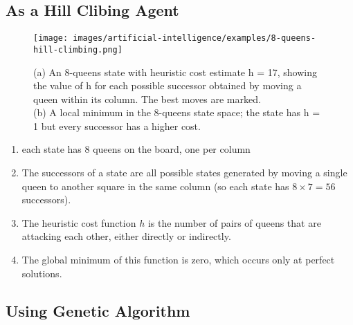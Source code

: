 \subsection{As a Hill Clibing Agent}

\begin{figure}[H]
    \centering
    \texttt{[image: images/artificial-intelligence/examples/8-queens-hill-climbing.png]}
    \caption{
        (a) An 8-queens state with heuristic cost estimate h = 17, showing the value of h for each possible successor obtained by moving a queen within its column. The best moves are marked.  
        \hfill \cite{ai/book/Artificial-Intelligence-A-Modern-Approach/Russell-Norvig}
        \\
        (b) A local minimum in the 8-queens state space; the state has h = 1 but every successor has a higher cost.
        \hfill \cite{ai/book/Artificial-Intelligence-A-Modern-Approach/Russell-Norvig}
    }
\end{figure}

\vspace{0.5cm}

\begin{enumerate}
    \item each state has $8$ queens on the board, one per column
    \hfill \cite{ai/book/Artificial-Intelligence-A-Modern-Approach/Russell-Norvig}

    \item The successors of a state are all possible states generated by moving a single queen to another square in the same column (so each state has $8 \times 7 = 56$ successors). 
    \hfill \cite{ai/book/Artificial-Intelligence-A-Modern-Approach/Russell-Norvig}

    \item The heuristic cost function $h$ is the number of pairs of queens that are attacking each other, either directly or indirectly.
    \hfill \cite{ai/book/Artificial-Intelligence-A-Modern-Approach/Russell-Norvig}

    \item The global minimum of this function is zero, which occurs only at perfect solutions. 
    \hfill \cite{ai/book/Artificial-Intelligence-A-Modern-Approach/Russell-Norvig}
\end{enumerate}



\subsection{Using Genetic Algorithm}

